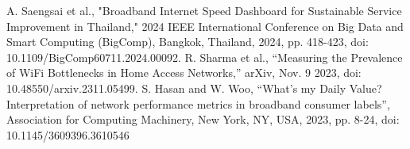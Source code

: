 \documentclass[conference]{IEEEtran}
\begin{document}
\begin{thebibliography}{00}
 A. Saengsai et al., "Broadband Internet Speed Dashboard for Sustainable Service Improvement in Thailand," 2024 IEEE International Conference on Big Data and Smart Computing (BigComp), Bangkok, Thailand, 2024, pp. 418-423, doi: 10.1109/BigComp60711.2024.00092. 
 R. Sharma et al., “Measuring the Prevalence of WiFi Bottlenecks in Home Access Networks,” arXiv, Nov. 9 2023, doi: 10.48550/arxiv.2311.05499.
 S. Hasan and W. Woo, “What's my Daily Value? Interpretation of network performance metrics in broadband consumer labels”, Association for Computing Machinery, New York, NY, USA, 2023, pp. 8-24, doi: 10.1145/3609396.3610546

\end{thebibliography}
\end{document}
